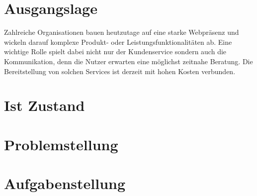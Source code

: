\section{Ausgangslage}
Zahlreiche Organisationen bauen heutzutage auf eine starke Webpräsenz und wickeln darauf komplexe Produkt- oder Leistungsfunktionalitäten ab. Eine wichtige Rolle spielt dabei nicht nur der Kundenservice sondern auch die Kommunikation, denn die Nutzer erwarten eine möglichst zeitnahe Beratung. Die Bereitstellung von solchen Services ist derzeit mit hohen Kosten verbunden.

\section{Ist Zustand}



\section{Problemstellung}


\section{Aufgabenstellung}


